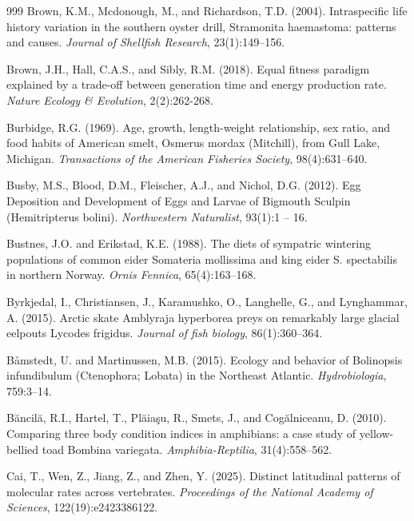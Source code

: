 \begin{thebibliography}{999}
Brown, K.M., Mcdonough, M., and Richardson, T.D. (2004). Intraspecific life history variation in the southern oyster drill, Stramonita haemastoma: patterns and causes. \textit{Journal of Shellfish Research}, 23(1):149--156.

Brown, J.H., Hall, C.A.S., and Sibly, R.M. (2018). Equal fitness paradigm explained by a trade-off between generation time and energy production rate. \textit{Nature Ecology \& Evolution}, 2(2):262-268.

Burbidge, R.G. (1969). Age, growth, length-weight relationship, sex ratio, and food habits of American smelt, Osmerus mordax (Mitchill), from Gull Lake, Michigan. \textit{Transactions of the American Fisheries Society}, 98(4):631--640.

Busby, M.S., Blood, D.M., Fleischer, A.J., and Nichol, D.G. (2012). Egg Deposition and Development of Eggs and Larvae of Bigmouth Sculpin (Hemitripterus bolini). \textit{Northwestern Naturalist}, 93(1):1 -- 16.

Bustnes, J.O. and Erikstad, K.E. (1988). The diets of sympatric wintering populations of common eider Somateria mollissima and king eider S. spectabilis in northern Norway. \textit{Ornis Fennica}, 65(4):163--168.

Byrkjedal, I., Christiansen, J., Karamushko, O., Langhelle, G., and Lynghammar, A. (2015). Arctic skate Amblyraja hyperborea preys on remarkably large glacial eelpouts Lycodes frigidus. \textit{Journal of fish biology}, 86(1):360--364.

B{\aa}mstedt, U. and Martinussen, M.B. (2015). Ecology and behavior of Bolinopsis infundibulum (Ctenophora; Lobata) in the Northeast Atlantic. \textit{Hydrobiologia}, 759:3--14.

B{\u{a}}ncil{\u{a}}, R.I., Hartel, T., Pl{\u{a}}ia{\c{s}}u, R., Smets, J., and Cog{\u{a}}lniceanu, D. (2010). Comparing three body condition indices in amphibians: a case study of yellow-bellied toad Bombina variegata. \textit{Amphibia-Reptilia}, 31(4):558--562.

Cai, T., Wen, Z., Jiang, Z., and Zhen, Y. (2025). Distinct latitudinal patterns of molecular rates across vertebrates. \textit{Proceedings of the National Academy of Sciences}, 122(19):e2423386122.


\end{thebibliography}

